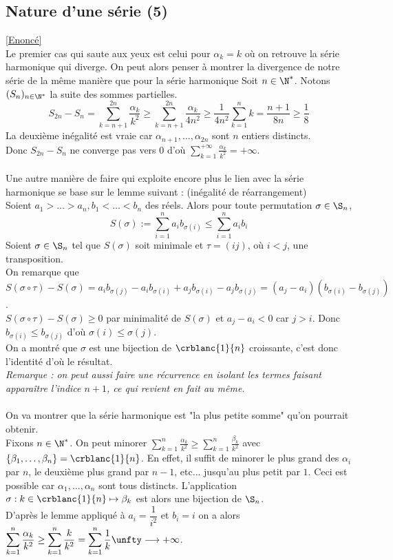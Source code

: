 \documentclass{book}
\begin{document}
	\subsection{Nature d'une série (5) }
	\label{Nature d'une série (5) corrigé}
	\textcolor{blue}{\hyperref[Nature d'une série (5)]{[Enoncé]}}\\
	Le premier cas qui saute aux yeux est celui pour $\alpha_k=k$ où on retrouve la série harmonique qui diverge. On peut alors penser à montrer la divergence de notre série de la même manière que pour la série harmonique
	Soit $n\in \N^*$. Notons $(S_n)_{n\in \N^*}$ la suite des sommes partielles.
	$$S_{2n}-S_n=\sum_{k=n+1}^{2n}\frac{\alpha_k}{k^2}\geq \sum_{k=n+1}^{2n}\frac{\alpha_k}{4n^2}\geq\frac{1}{4n^2}\sum_{k=1}^nk=\frac{n+1}{8n}\geq \frac{1}{8}$$
	La deuxième inégalité est vraie car $\alpha_{n+1},\dots,\alpha_{2n}$ sont $n$ entiers distincts.\\
	Donc $S_{2n}-S_n$ ne converge pas vers $0$ d'où $\displaystyle\sum_{k=1}^{+\infty}\frac{\alpha_k}{k^2}=+\infty$.\\\\
	Une autre manière de faire qui exploite encore plus le lien avec la série harmonique se base sur le lemme suivant : (inégalité de réarrangement)\\
	Soient $a_1>\dots>a_n,b_1<\dots<b_n$ des réels. Alors pour toute permutation $\sigma\in \S_n$,
	$$S(\sigma):=\sum_{i=1}^na_ib_{\sigma(i)}\leq \sum_{i=1}^na_ib_i$$
	Soient $\sigma\in \S_n$ tel que $S(\sigma)$ soit minimale et $\tau=(ij)$, où $i<j$, une transposition.\\
	On remarque que $S(\sigma\circ\tau)-S(\sigma)=a_ib_{\sigma(j)}-a_ib_{\sigma(i)}+a_jb_{\sigma(i)}-a_jb_{\sigma(j)}=(a_j-a_i)(b_{\sigma(i)}-b_{\sigma(j)})$.\\
	$S(\sigma\circ\tau)-S(\sigma)\geq 0$ par minimalité de $S(\sigma)$ et $a_j-a_i<0$ car $j>i$. Donc $b_{\sigma(i)}\leq b_{\sigma(j)}$ d'où $\sigma(i)\leq \sigma(j)$.\\
	On a montré que $\sigma$ est une bijection de $\crblanc{1}{n}$ croissante, c'est donc l'identité d'où le résultat.\\
	\textit{Remarque : on peut aussi faire une récurrence en isolant les termes faisant apparaître l'indice $n+1$, ce qui revient en fait au même.}\\\\
	On va montrer que la série harmonique est "la plus petite somme" qu'on pourrait obtenir.\\
	Fixons $n\in \N^*$. On peut minorer $\displaystyle\sum_{k=1}^n\frac{\alpha_k}{k^2}\geq \sum_{k=1}^n\frac{\beta_k}{k^2}$ avec $\{\beta_1,\dots,\beta_n\}=\crblanc{1}{n}$. En effet, il suffit de minorer le plus grand des $\alpha_i$ par $n$, le deuxième plus grand par $n-1$, etc... jusqu'au plus petit par $1$. Ceci est possible car $\alpha_1,\dots,\alpha_n$ sont tous distincts.
	L'application $\sigma:k\in\crblanc{1}{n}\mapsto \beta_k$ est alors une bijection de $\S_n$.\\
	D'après le lemme appliqué à $a_i=\dfrac{1}{i^2}$ et $b_i=i$ on a alors $\displaystyle\sum_{k=1}^n\frac{\alpha_k}{k^2}\geq \sum_{k=1}^n\frac{k}{k^2}=\sum_{k=1}^n\frac{1}{k}\unfty\longrightarrow+\infty$.
	
\end{document}
